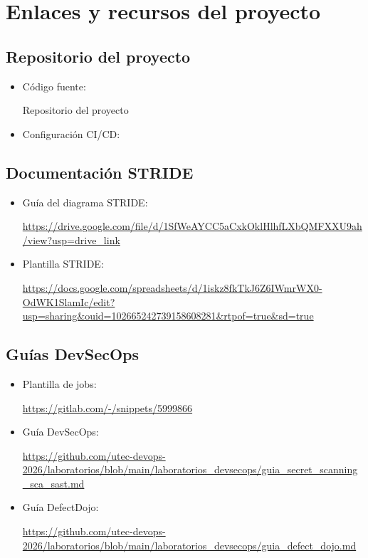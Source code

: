 
\chapter{Enlaces y recursos del proyecto}

\section{Repositorio del proyecto}

\begin{itemize}
    \item Código fuente:

    {Repositorio del proyecto}

    \item Configuración CI/CD:

\end{itemize}

\section{Documentación STRIDE}

\begin{itemize}
    \item Guía del diagrama STRIDE:

    \url{https://drive.google.com/file/d/1SfWeAYCC5aCxkOklHlhfLXbQMFXXU9ah/view?usp=drive_link}

    \item Plantilla STRIDE:

    \url{https://docs.google.com/spreadsheets/d/1iskz8fkTkJ6Z6IWmrWX0-OdWK1SlamIc/edit?usp=sharing&ouid=102665242739158608281&rtpof=true&sd=true}
\end{itemize}

\section{Guías DevSecOps}

\begin{itemize}
    \item Plantilla de jobs:

    \url{https://gitlab.com/-/snippets/5999866}

    \item Guía DevSecOps:

    \url{https://github.com/utec-devops-2026/laboratorios/blob/main/laboratorios_devsecops/guia_secret_scanning_sca_sast.md}

    \item Guía DefectDojo:

    \url{https://github.com/utec-devops-2026/laboratorios/blob/main/laboratorios_devsecops/guia_defect_dojo.md}
\end{itemize}

